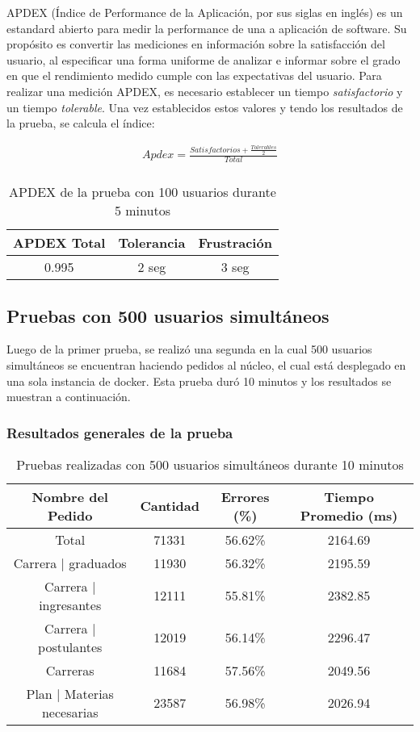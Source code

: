 APDEX (Índice de Performance de la Aplicación, por sus siglas en inglés) es un estandard abierto para medir la performance de una a aplicación de software. Su propósito es convertir las mediciones en información sobre la satisfacción del usuario, al especificar una forma uniforme de analizar e informar sobre el grado en que el rendimiento medido cumple con las expectativas del usuario.
Para realizar una medición APDEX, es necesario establecer un tiempo \emph{satisfactorio} y un tiempo \emph{tolerable}.
Una vez establecidos estos valores y tendo los resultados de la prueba, se calcula el índice:

\begin{align*}
  Apdex = \frac{Satisfactorios + \frac{Tolerables}{2}}{Total}\\
\end{align*}
\break
\begin{table}[!htbp]
    \centering
    \makegapedcells
    \begin{tabular}{|c|c|c|}
    \hline
    APDEX Total & Tolerancia & Frustración\\ \hline
    0.995 & 2 seg & 3 seg \\ \hline
    \end{tabular}
    \caption{APDEX de la prueba con 100 usuarios durante 5 minutos}
    \label{tab:tabla_planes}
\end{table}


\break

\subsection{Pruebas con 500 usuarios simultáneos}
Luego de la primer prueba, se realizó una segunda en la cual 500 usuarios simultáneos se encuentran haciendo pedidos al núcleo, el cual está desplegado en una sola instancia de docker.
Esta prueba duró 10 minutos y los resultados se muestran a continuación.

\subsubsection{Resultados generales de la prueba}
\begin{table}[!htbp]
    \centering
    \makegapedcells
    \begin{tabular}{|c|c|c|c|}
    \hline
    Nombre del Pedido & Cantidad & Errores (\%) & Tiempo Promedio (ms) \\ \hline
    Total & 71331 & 56.62\% & 2164.69\\ \hline
    Carrera | graduados & 11930 & 56.32\% & 2195.59\\ \hline
    Carrera | ingresantes & 12111 & 55.81\% & 2382.85\\ \hline
    Carrera | postulantes & 12019 & 56.14\% & 2296.47\\ \hline
    Carreras & 11684 & 57.56\% & 2049.56\\ \hline
    Plan | Materias necesarias & 23587 & 56.98\% & 2026.94\\
    \end{tabular}
    \caption{Pruebas realizadas con 500 usuarios simultáneos durante 10 minutos}
    \label{tab:tabla_planes}
\end{table}

